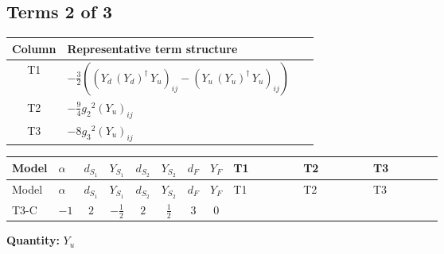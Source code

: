 \documentclass[8pt]{article}
\begin{document}
\begin{landscape}
\subsection*{Terms 2 of 3}
\begin{center}
\begin{tabular}{@{}c >{\raggedright\arraybackslash}p{0.82\linewidth}@{}}
\toprule
Column & Representative term structure \\
\midrule
T1 & \(\displaystyle -\frac{3}{2} (\left({Y_d}\,\left({Y_d}\right)^{\dagger}\,{Y_u}\right)_{ij}-\left({Y_u}\,\left({Y_u}\right)^{\dagger}\,{Y_u}\right)_{ij})\) \\
\midrule
T2 & \(\displaystyle -\frac{9}{4} {g_2}^2 \left({Y_u}\right)_{ij}\) \\
\midrule
T3 & \(\displaystyle -8 {g_3}^2 \left({Y_u}\right)_{ij}\) \\
\midrule
\bottomrule
\end{tabular}
\end{center}
\smallskip
\tiny
\begin{longtable}{@{}llcccccc >{\raggedright\arraybackslash}p{0.21\linewidth} >{\raggedright\arraybackslash}p{0.21\linewidth} >{\raggedright\arraybackslash}p{0.21\linewidth}@{}}
\toprule
Model & $\alpha$ & $d_{S_1}$ & $Y_{S_1}$ & $d_{S_2}$ & $Y_{S_2}$ & $d_F$ & $Y_F$ & T1 & T2 & T3 \\
\midrule
\endfirsthead
\toprule
Model & $\alpha$ & $d_{S_1}$ & $Y_{S_1}$ & $d_{S_2}$ & $Y_{S_2}$ & $d_F$ & $Y_F$ & T1 & T2 & T3 \\
\midrule
\endhead
T3-C & $-1$ & $2$ & $-\frac{1}{2}$ & $2$ & $\frac{1}{2}$ & $3$ & $0$ & \scriptsize\adjustbox{max width=\linewidth}{$\begin{gathered} -\frac{3}{2} (\left({Y_d}\,\left({Y_d}\right)^{\dagger}\,{Y_u}\right)_{ij}-\left({Y_u}\,\left({Y_u}\right)^{\dagger}\,{Y_u}\right)_{ij})\end{gathered}$} & \scriptsize\adjustbox{max width=\linewidth}{$\begin{gathered} -\frac{9}{4} {g_2}^2 \left({Y_u}\right)_{ij}\end{gathered}$} & \scriptsize\adjustbox{max width=\linewidth}{$\begin{gathered} -8 {g_3}^2 \left({Y_u}\right)_{ij}\end{gathered}$} \\
\midrule
\bottomrule
\end{longtable}
\clearpage
\noindent\textbf{Quantity: }$Y_u$\par\smallskip

\end{landscape}
\end{document}
